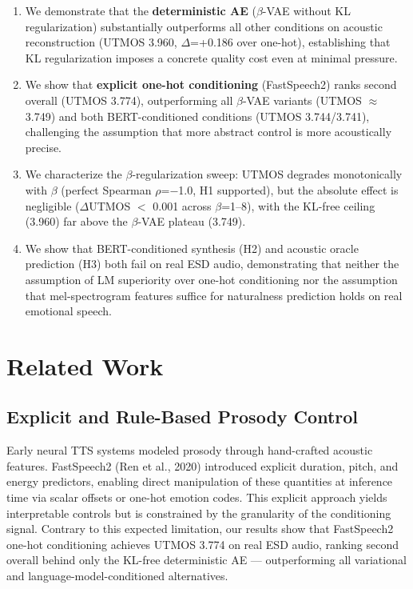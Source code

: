 \documentclass{article}
\begin{document}
\begin{enumerate}
  \item We demonstrate that the \textbf{deterministic AE} ($\beta$-VAE without KL regularization) substantially outperforms all other conditions on acoustic reconstruction (UTMOS 3.960, $\Delta$=+0.186 over one-hot), establishing that KL regularization imposes a concrete quality cost even at minimal pressure.
  \item We show that \textbf{explicit one-hot conditioning} (FastSpeech2) ranks second overall (UTMOS 3.774), outperforming all $\beta$-VAE variants (UTMOS $\approx$ 3.749) and both BERT-conditioned conditions (UTMOS 3.744/3.741), challenging the assumption that more abstract control is more acoustically precise.
  \item We characterize the $\beta$-regularization sweep: UTMOS degrades monotonically with $\beta$ (perfect Spearman $\rho$=$-$1.0, H1 supported), but the absolute effect is negligible ($\Delta$UTMOS $<$ 0.001 across $\beta$=1--8), with the KL-free ceiling (3.960) far above the $\beta$-VAE plateau (3.749).
  \item We show that BERT-conditioned synthesis (H2) and acoustic oracle prediction (H3) both fail on real ESD audio, demonstrating that neither the assumption of LM superiority over one-hot conditioning nor the assumption that mel-spectrogram features suffice for naturalness prediction holds on real emotional speech.
\end{enumerate}

\section{Related Work}

\label{sec:related_work}

\subsection{Explicit and Rule-Based Prosody Control}

\label{sec:explicit_and_rule_based_prosody_control}

Early neural TTS systems modeled prosody through hand-crafted acoustic features. FastSpeech2 (Ren et al., 2020) introduced explicit duration, pitch, and energy predictors, enabling direct manipulation of these quantities at inference time via scalar offsets or one-hot emotion codes. This explicit approach yields interpretable controls but is constrained by the granularity of the conditioning signal. Contrary to this expected limitation, our results show that FastSpeech2 one-hot conditioning achieves UTMOS 3.774 on real ESD audio, ranking second overall behind only the KL-free deterministic AE --- outperforming all variational and language-model-conditioned alternatives.
\end{document}
